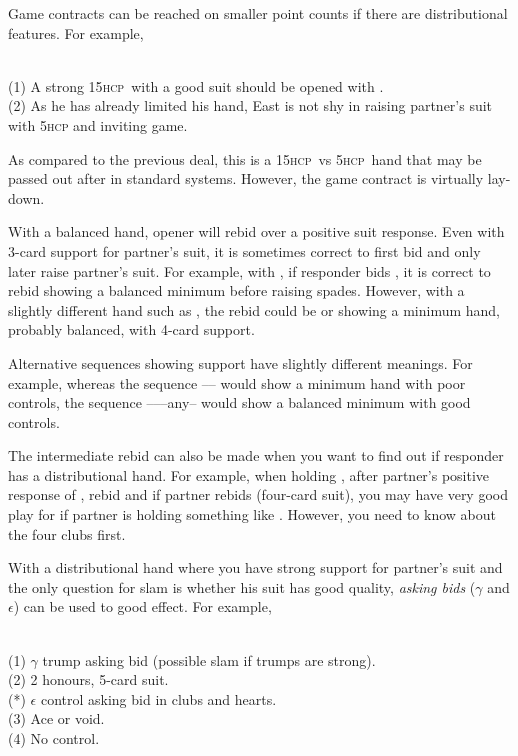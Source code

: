 \documentclass[a4paper,article,oneside]{memoir}
\newcommand{\gap}{\vspace{\baselineskip}}
\newcommand{\hcp}{\textsc{hcp}}
\begin{document}
\gap
Game contracts can be reached on smaller point counts if there are
distributional features. For example,

 \\ (1) A strong 15\hcp\ with a
good suit should be opened with .\\ (2) As he has already
limited his hand, East is not shy in raising partner's suit with 5\hcp
and inviting game.

As compared to the previous deal, this is a 15\hcp\ vs 5\hcp\ hand
that may be passed out after  in standard systems. However, the
game contract is virtually lay-down.

\gap
With a balanced hand, opener will rebid \nt{} over a positive suit
response.  Even with 3-card support for partner's suit, it is
sometimes correct to first bid \nt{} and only later raise partner's
suit. For example, with , if responder bids
, it is correct to rebid  showing a balanced minimum
before raising spades. However, with a slightly different hand such as
, the rebid could be  or  showing
a minimum hand, probably balanced, with 4-card support.

Alternative sequences showing support have slightly different
meanings.  For example, whereas the sequence ----
would show a minimum hand with poor controls, the sequence
------any-- would show a balanced minimum with
good controls.

The intermediate  rebid can also be made when you want to find
out if responder has a distributional hand. For example, when holding
, after partner's positive response of ,
rebid  and if partner rebids  (four-card suit), you may
have very good play for  if partner is holding something like
.  However, you need to know about the four
clubs first.

\gap
With a distributional hand where you have strong support for partner's
suit and the only question for slam is whether his suit has good
quality, \emph{asking bids} ($\gamma$ and $\epsilon$) can be used to
good effect. For example,

 \\
(1) $\gamma$ trump asking bid (possible slam if trumps are strong). \\
(2) 2 honours, 5-card suit. \\ (*) $\epsilon$ control asking bid in clubs and hearts. \\
(3) Ace or void. \\ (4) No control.
\end{document}
